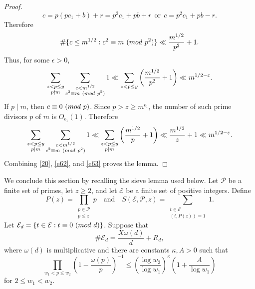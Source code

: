 \documentclass[10pt,a4paper]{amsart}
\numberwithin{equation}{section}
\def\pmod #1{\ ({\rm{mod}}\ #1)}
\begin{document}
\begin{proof}
$$c=p(pc_{1}+b)+ r=p^{2}c_{1}+pb+r\ \ \mbox{or}\ \ c=p^{2}c_{1}+pb-r.$$
Therefore
\[
\#\{c \leq m^{1/2}: c^2 \equiv m \pmod{p^2}\} \ll \frac{m^{1/2}}{p^2}+1. 
\]
Thus, for some $\epsilon>0$,
\begin{equation}\label{e62}
\sum_{\substack{z<p\leq y\\ p\nmid m}}
\sum_{\substack{c<m^{1/2}\\ c^2\equiv m\pmod {p^2}}}1
\ll
\sum_{z<p\leq y}\left(\frac{m^{1/2}}{p^2}+1\right)
\ll m^{1/2-\varepsilon}.
\end{equation}
If $p\mid m$, then $c\equiv0\pmod p$. Since $p>z\geq m^{\epsilon_1}$, the number of such prime divisors $p$ of $m$ is $O_{\epsilon_1}(1)$. Therefore
\begin{equation}\label{e63}
\sum_{\substack{z<p\leq y\\ p\mid m}}
\sum_{\substack{c<m^{1/2}\\ c^2\equiv m\pmod {p^2}}}1
\ll
\sum_{\substack{z<p\leq y\\ p\mid m}}
\left(\frac{m^{1/2}}p+1\right)
\ll \frac{m^{1/2}}z+1
\ll m^{1/2-\varepsilon}.
\end{equation}
Combining \eqref{20}, \eqref{e62}, and \eqref{e63} proves the lemma.
\end{proof}

We conclude this section by recalling the sieve lemma used below. Let $\mathcal P$ be a finite set of primes, let $z\geq2$, and let $\mathcal E$ be a finite set of positive integers. Define
\[
P(z)=\prod_{\substack{p\in \mathcal{P} \\ p \leq  z}}p \quad \text{and} \quad S(\mathcal{E},\mathcal{P},z)=\!\!\!\sum_{\substack{t\in\mathcal{E} \\ (t,P(z))=1}}\!\!\!1.
\]
Let $\mathcal E_d=\{t\in\mathcal E:t\equiv0\pmod d\}$. Suppose that
\[
\#\mathcal E_d=\frac{X\omega(d)}d+R_d,
\]
where $\omega(d)$ is multiplicative and there are constants $\kappa,A>0$ such that
\begin{equation}\label{e73}
\prod_{w_1<p\leq w_2}
\left(1-\frac{\omega(p)}p\right)^{-1}
\leq
\left(\frac{\log w_2}{\log w_1}\right)^\kappa
\left(1+\frac A{\log w_1}\right)
\end{equation}
for $2\leq w_1<w_2$.
\end{document}
